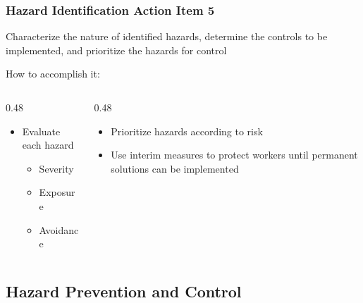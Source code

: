 \begin{frame}
	\frametitle{Hazard Identification Action Item 5}

    Characterize the nature of identified hazards, determine the controls to be implemented, and prioritize the hazards for control

    \begin{block}{How to accomplish it:}
        \vspace{-1.5em}
        \begin{columns}
            \begin{column}{0.48\linewidth}
                \begin{itemize}[<+- | alert@+>]
                    \item Evaluate each hazard
                    \begin{itemize}
                        \item Severity
                        \item Exposure
                        \item Avoidance
                    \end{itemize}
                \end{itemize}
            \end{column}
            \begin{column}{0.48\linewidth}
                \begin{itemize}[<+- | alert@+>]
                    \item Prioritize hazards according to risk
                    \item Use interim measures to protect workers until permanent solutions can be implemented
                \end{itemize}
            \end{column}
        \end{columns}
    \end{block}
\end{frame}

\subsection{Hazard Prevention and Control}

